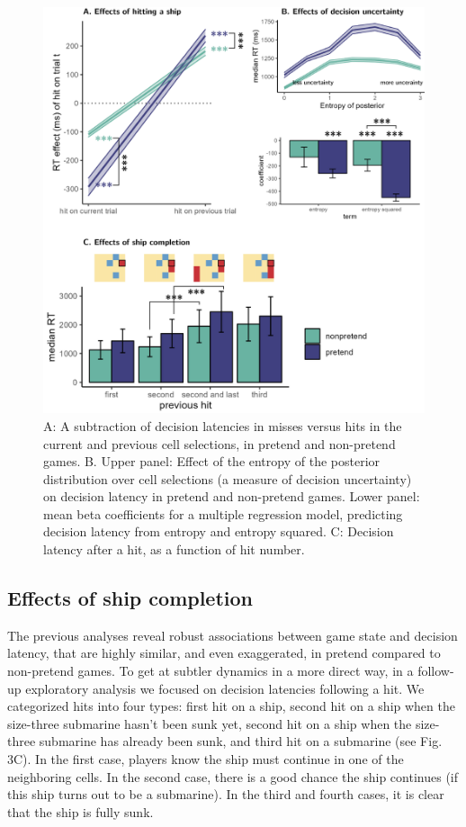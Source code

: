\documentclass[10pt, letterpaper]{article}
\newenvironment{CodeChunk}{}{}
\begin{document}
\begin{CodeChunk}
\begin{figure}[tb]
\includegraphics[width=1\linewidth]{../figures/decision_latencies} \caption[A]{A: A subtraction of decision latencies in misses versus hits in the current and previous cell selections, in pretend and non-pretend games. B. Upper panel: Effect of the entropy of the posterior distribution over cell selections (a measure of decision uncertainty) on decision latency in pretend and non-pretend games. Lower panel: mean beta coefficients for a multiple regression model, predicting decision latency from entropy and entropy squared. C: Decision latency after a hit, as a function of hit number.}\label{fig:latency}
\end{figure}
\end{CodeChunk}

\hypertarget{effects-of-ship-completion}{%
\subsection{Effects of ship
completion}\label{effects-of-ship-completion}}

The previous analyses reveal robust associations between game state and
decision latency, that are highly similar, and even exaggerated, in
pretend compared to non-pretend games. To get at subtler dynamics in a
more direct way, in a follow-up exploratory analysis we focused on
decision latencies following a hit. We categorized hits into four types:
first hit on a ship, second hit on a ship when the size-three submarine
hasn't been sunk yet, second hit on a ship when the size-three submarine
has already been sunk, and third hit on a submarine (see Fig. 3C). In
the first case, players know the ship must continue in one of the
neighboring cells. In the second case, there is a good chance the ship
continues (if this ship turns out to be a submarine). In the third and
fourth cases, it is clear that the ship is fully sunk.
\end{document}

